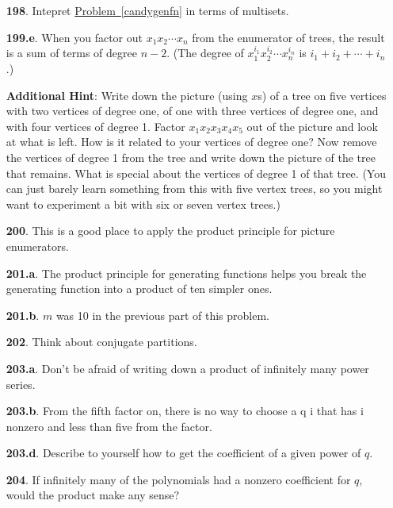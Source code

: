 \documentclass[10pt,]{book}
\theoremstyle{plain}
\theoremstyle{definition}
\theoremstyle{definition}
\numberwithin{equation}{chapter}
\begin{document}
\begin{itemize}[itemsep=1em]
\item[\textbf{198}.]Intepret \hyperref[candygenfn]{Problem~\ref{candygenfn}} in terms of multisets.%

\item[\textbf{199.e}.]When you factor out \(x_1 x_2\cdots x_n\) from the enumerator of trees, the result is a sum of terms of degree \(n - 2\). (The degree of \(x_1^{i_1} x_2^{i_2} \cdots x_n^{i_n}\) is \(i_1 + i_2 + \cdots + i_n\).)%

\par\smallskip
\noindent\textbf{Additional Hint}: Write down the picture (using \(x\)s) of a tree on five vertices with two vertices of degree one, of one with three vertices of degree one, and with four vertices of degree 1. Factor \(x_1 x_2 x_3 x_4 x_5\) out of the picture and look at what is left.  How is it related to your vertices of degree one? Now remove the vertices of degree 1 from the tree and write down the picture of the tree that remains.  What is special about the vertices of degree 1 of that tree. (You can just barely learn something from this with five vertex trees, so you might want to experiment a bit with six or seven vertex trees.)%

\item[\textbf{200}.]This is a good place to apply the product principle for picture enumerators.%

\item[\textbf{201.a}.]The product principle for generating functions helps you break the generating function into a product of ten simpler ones.%

\item[\textbf{201.b}.]\(m\) was 10 in the previous part of this problem.%

\item[\textbf{202}.]Think about conjugate partitions.%

\item[\textbf{203.a}.]Don't be afraid of writing down a product of infinitely many power series.%

\item[\textbf{203.b}.]From the fifth factor on, there is no way to choose a q i that has i nonzero and less than five from the factor.%

\item[\textbf{203.d}.]Describe to yourself how to get the coefficient of a given power of \(q\).%

\item[\textbf{204}.]If infinitely many of the polynomials had a nonzero coefficient for \(q\), would the product make any sense?%


\end{itemize}
\end{document}
